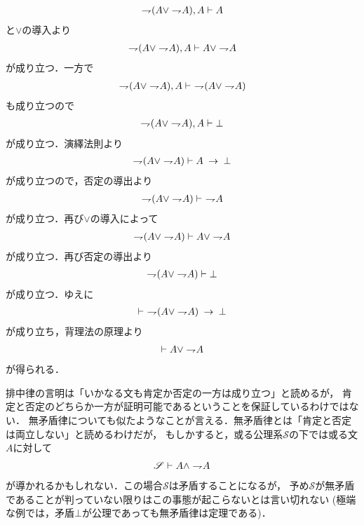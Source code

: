 	\begin{prf}
		\begin{align}
			\rightharpoondown\hspace{-0.25em} (A \vee \rightharpoondown\hspace{-0.25em} A), A \vdash A
		\end{align}
		と$\vee$の導入より
		\begin{align}
			\rightharpoondown\hspace{-0.25em} (A \vee \rightharpoondown\hspace{-0.25em} A), A \vdash A \vee \rightharpoondown\hspace{-0.25em} A
		\end{align}
		が成り立つ．一方で
		\begin{align}
			\rightharpoondown\hspace{-0.25em} (A \vee \rightharpoondown\hspace{-0.25em} A), A \vdash\ \rightharpoondown\hspace{-0.25em} (A \vee \rightharpoondown\hspace{-0.25em} A)
		\end{align}
		も成り立つので
		\begin{align}
			\rightharpoondown\hspace{-0.25em} (A \vee \rightharpoondown\hspace{-0.25em} A), A \vdash \bot
		\end{align}
		が成り立つ．演繹法則より
		\begin{align}
			\rightharpoondown\hspace{-0.25em} (A \vee \rightharpoondown\hspace{-0.25em} A) \vdash A \hspace{0.25em}\rightarrow\hspace{0.25em} \bot
		\end{align}
		が成り立つので，否定の導出より
		\begin{align}
			\rightharpoondown\hspace{-0.25em} (A \vee \rightharpoondown\hspace{-0.25em} A) \vdash\ \rightharpoondown\hspace{-0.25em} A
		\end{align}
		が成り立つ．再び$\vee$の導入によって
		\begin{align}
			\rightharpoondown\hspace{-0.25em} (A \vee \rightharpoondown\hspace{-0.25em} A) \vdash A \vee \rightharpoondown\hspace{-0.25em} A
		\end{align}
		が成り立つ．再び否定の導出より
		\begin{align}
			\rightharpoondown\hspace{-0.25em} (A \vee \rightharpoondown\hspace{-0.25em} A) \vdash \bot
		\end{align}
		が成り立つ．ゆえに
		\begin{align}
			\vdash\ \rightharpoondown\hspace{-0.25em} (A \vee \rightharpoondown\hspace{-0.25em} A) \hspace{0.25em}\rightarrow\hspace{0.25em} \bot
		\end{align}
		が成り立ち，背理法の原理より
		\begin{align}
			\vdash A \vee \rightharpoondown\hspace{-0.25em} A
		\end{align}
		が得られる．
		\QED
	\end{prf}
	
	排中律の言明は「いかなる文も肯定か否定の一方は成り立つ」と読めるが，
	肯定と否定のどちらか一方が証明可能であるということを保証しているわけではない．
	無矛盾律についても似たようなことが言える．無矛盾律とは「肯定と否定は両立しない」と読めるわけだが，
	もしかすると，或る公理系$\mathscr{S}$の下では或る文$A$に対して
	\begin{align}
		\mathscr{S} \vdash A \wedge \rightharpoondown\hspace{-0.25em} A
	\end{align}
	が導かれるかもしれない．この場合$\mathscr{S}$は矛盾することになるが，
	予め$\mathscr{S}$が無矛盾であることが判っていない限りはこの事態が起こらないとは言い切れない
	(極端な例では，矛盾$\bot$が公理であっても無矛盾律は定理である)．
	
